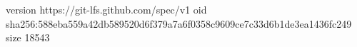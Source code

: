 version https://git-lfs.github.com/spec/v1
oid sha256:588eba559a42db589520d6f379a7a6f0358c9609ce7c33d6b1de3ea1436fc249
size 18543
